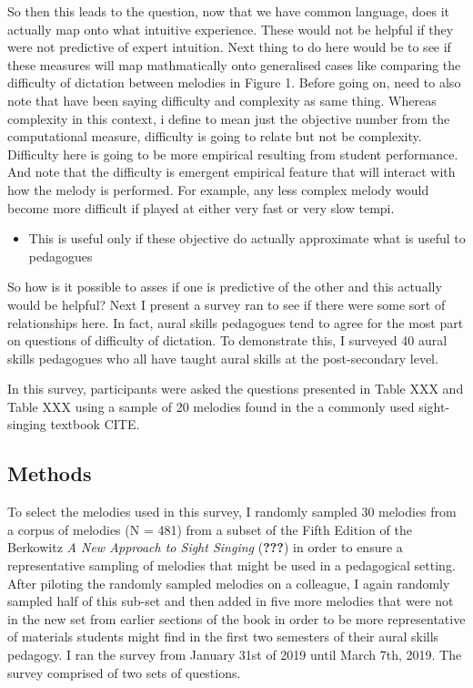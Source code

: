\documentclass[english,man,floatsintext]{apa6}
\providecommand{\tightlist}{%
  \setlength{\itemsep}{0pt}\setlength{\parskip}{0pt}}
\begin{document}
So then this leads to the question, now that we have common language, does it actually map onto what intuitive experience.
These would not be helpful if they were not predictive of expert intuition.
Next thing to do here would be to see if these measures will map mathmatically onto generalised cases like comparing the difficulty of dictation between melodies in Figure 1.
Before going on, need to also note that have been saying difficulty and complexity as same thing.
Whereas complexity in this context, i define to mean just the objective number from the computational measure, difficulty is going to relate but not be complexity.
Difficulty here is going to be more empirical resulting from student performance.
And note that the difficulty is emergent empirical feature that will interact with how the melody is performed.
For example, any less complex melody would become more difficult if played at either very fast or very slow tempi.

\begin{itemize}
\tightlist
\item
  This is useful only if these objective do actually approximate what is useful to pedagogues
\end{itemize}

So how is it possible to asses if one is predictive of the other and this actually would be helpful?
Next I present a survey ran to see if there were some sort of relationships here.
In fact, aural skills pedagogues tend to agree for the most part on questions of difficulty of dictation.
To demonstrate this, I surveyed 40 aural skills pedagogues who all have taught aural skills at the post-secondary level.

In this survey, participants were asked the questions presented in Table XXX and Table XXX using a sample of 20 melodies found in the a commonly used sight-singing textbook CITE.

\hypertarget{methods}{%
\subsection{Methods}\label{methods}}

To select the melodies used in this survey, I randomly sampled 30 melodies from a corpus of melodies (N = 481) from a subset of the Fifth Edition of the Berkowitz \emph{A New Approach to Sight Singing} ({\textbf{???}}) in order to ensure a representative sampling of melodies that might be used in a pedagogical setting.
After piloting the randomly sampled melodies on a colleague, I again randomly sampled half of this sub-set and then added in five more melodies that were not in the new set from earlier sections of the book in order to be more representative of materials students might find in the first two semesters of their aural skills pedagogy.
I ran the survey from January 31st of 2019 until March 7th, 2019.
The survey comprised of two sets of questions.
\end{document}
